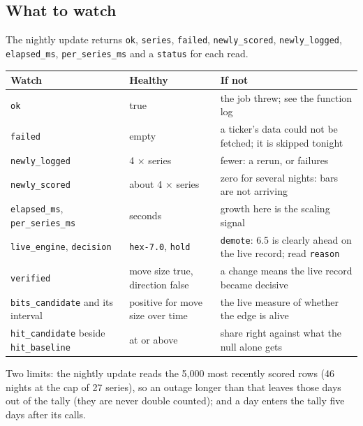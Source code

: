 \documentclass[10.5pt]{article}
\begin{document}
\subsection*{What to watch}
{\sloppy The nightly update returns \texttt{ok}, \texttt{series}, \texttt{failed}, \texttt{newly\_scored}, \texttt{newly\_logged}, \texttt{elapsed\_ms}, \texttt{per\_series\_ms} and a \texttt{status} for each read.\par}
\begin{center}\small\begin{tabular}{@{}p{4.6cm}p{3.4cm}p{6.8cm}@{}}\toprule
Watch & Healthy & If not\\\midrule
\texttt{ok} & true & the job threw; see the function log\\
\texttt{failed} & empty & a ticker's data could not be fetched; it is skipped tonight\\
\texttt{newly\_logged} & 4 $\times$ series & fewer: a rerun, or failures\\
\texttt{newly\_scored} & about 4 $\times$ series & zero for several nights: bars are not arriving\\
\texttt{elapsed\_ms}, \texttt{per\_series\_ms} & seconds & growth here is the scaling signal\\
\texttt{live\_engine}, \texttt{decision} & \texttt{hex-7.0}, \texttt{hold} & \texttt{demote}: 6.5 is clearly ahead on the live record; read \texttt{reason}\\
\texttt{verified} & move size true, direction false & a change means the live record became decisive\\
\texttt{bits\_candidate} and its interval & positive for move size over time & the live measure of whether the edge is alive\\
\texttt{hit\_candidate} beside \texttt{hit\_baseline} & at or above & share right against what the null alone gets\\\bottomrule\end{tabular}\end{center}
Two limits: the nightly update reads the 5,000 most recently scored rows (46 nights at the cap of 27 series), so an outage longer than that leaves those days out of the tally (they are never double counted); and a day enters the tally five days after its calls.
\end{document}

